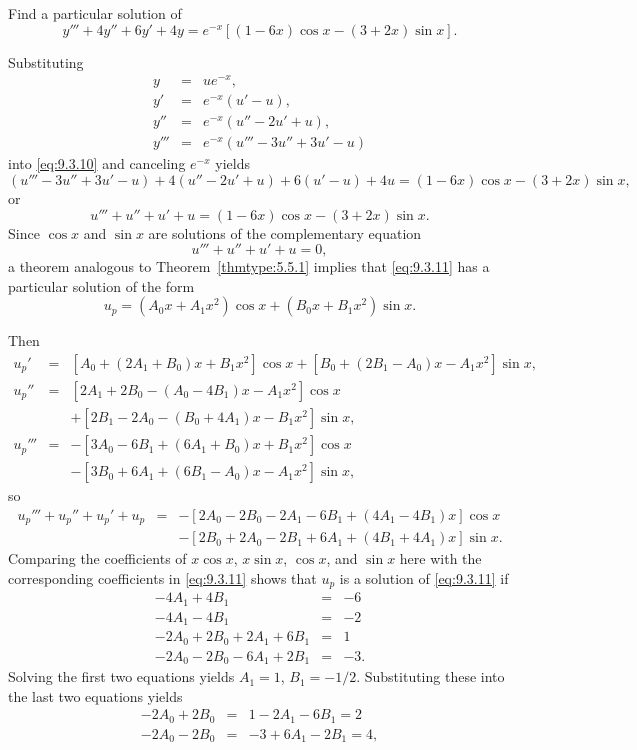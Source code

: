 \documentclass{ximera}
\begin{document}
\begin{example}\label{example:9.3.4}
Find a particular solution of
\begin{equation} \label{eq:9.3.10}
 y'''+4y''+6y'+4y=
e^{-x}\left[(1-6x)\cos x-(3+2x)\sin x\right].
\end{equation}

\begin{explanation} 
Substituting
\begin{eqnarray*}
y&=&ue^{-x},\\ y'&=&e^{-x}(u'-u),\\
y''&=&e^{-x}(u''-2u'+u),\\
y'''&=&e^{-x}(u'''-3u''+3u'-u)
\end{eqnarray*}
into \eqref{eq:9.3.10} and canceling $e^{-x}$ yields
$$
(u'''-3u''+3u'-u)+4(u''-2u'+u)+6(u'-u)+4u
=(1-6x)\cos x-(3+2x)\sin x,
$$
or
\begin{equation} \label{eq:9.3.11}
u'''+u''+u'+u=(1-6x)\cos x-(3+2x)\sin x.
\end{equation}
Since $\cos x$ and $\sin x$ are  solutions of the complementary
equation
$$
u'''+u''+u'+u=0,
$$
a theorem analogous to Theorem~\ref{thmtype:5.5.1} implies
that  \eqref{eq:9.3.11} has a particular solution of the form
\begin{equation} \label{eq:9.3.12}
u_p=(A_0x+A_1x^2)\cos x+(B_0x+B_1x^2)\sin x.
\end{equation}

Then
\begin{eqnarray*}
 u_p'&=&[A_0+(2A_1+B_0)x+B_1x^2]\cos
x+[B_0+(2B_1-A_0)x-A_1x^2]\sin x,\\
 u_p''&=&[2A_1+2B_0-(A_0-4B_1)x-A_1x^2]\cos x\\&&+
[2B_1-2A_0-(B_0+4A_1)x-B_1x^2]\sin x,\\
u_p'''&=&-[3A_0-6B_1+(6A_1+B_0)x+B_1x^2]\cos x
\\&&-[3B_0+6A_1+(6B_1-A_0)x-A_1x^2]\sin x,
\end{eqnarray*}
so
$$
\begin{array}{rcl}
u_p'''+u_p''+u_p'+u_p&=&
-[2A_0-2B_0-2A_1-6B_1+(4A_1-4B_1)x]\cos x\\
&&-[2B_0+2A_0-2B_1+6A_1+(4B_1+4A_1)x]\sin x.
\end{array}
$$
Comparing the coefficients of $x\cos x$, $x\sin x$, $\cos x$, and
$\sin x$ here with the corresponding coefficients in \eqref{eq:9.3.11}
shows that $u_p$ is a solution of \eqref{eq:9.3.11} if
$$
\begin{array}{rcr}
-4A_1+4B_1&=&-6\\
-4A_1-4B_1&=&-2\\
-2A_0+2B_0+2A_1+6B_1&=&1\\
-2A_0-2B_0-6A_1+2B_1&=&-3.
\end{array}
$$
Solving the first two equations yields $A_1=1$, $B_1=-1/2$.
Substituting these into the last two equations  yields
\begin{eqnarray*}
-2A_0+2B_0&=&1-2A_1-6B_1=2\\
-2A_0-2B_0&=&-3+6A_1-2B_1=4,
 \end{eqnarray*}


\end{explanation}
\end{example}
\end{document}
